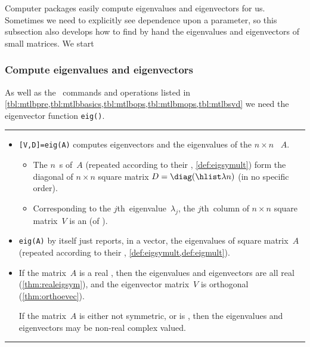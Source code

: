 Computer packages easily compute eigenvalues and eigenvectors for us.
Sometimes we need to explicitly see dependence upon a parameter, so this subsection also develops how to find by hand the eigenvalues and eigenvectors of small matrices.
We start 


\subsubsection{Compute eigenvalues and eigenvectors}
\label{sec:cee}

\begin{table}
\caption{As well as the \script\ commands and operations listed in \cref{tbl:mtlbpre,tbl:mtlbbasics,tbl:mtlbops,tbl:mtlbmops,tbl:mtlbsvd}  we need the eigenvector function \texttt{eig()}.} \label{tbl:mtlbeig}
\hrule
\begin{minipage}{\linewidth}
\begin{itemize}
\item {}\verb|[V,D]=eig(A)| computes eigenvectors and the eigenvalues of the  \(n\times n\) ~\(A\).
\begin{itemize}
\item The \(n\)~s of~\(A\) (repeated according to their , \cref{def:eigsymult}) form the diagonal of \(n\times n\) square matrix \(D=\diag(\hlist\lambda n)\) (in no specific order).
\item Corresponding to the \(j\)th~eigenvalue~\(\lambda_j\), the 
\(j\)th~column of \(n\times n\) square matrix~\(V\) is an 
 (of ).
\end{itemize}
\item \verb|eig(A)| by itself just reports, in a vector, the eigenvalues of square matrix~\(A\) (repeated according to their  , \cref{def:eigsymult,def:eigmult}).

\item If the matrix~\(A\) is a real , then the eigenvalues and eigenvectors are all real (\cref{thm:realeigsym}), and the eigenvector matrix~\(V\) is orthogonal (\cref{thm:orthoevec}).

If the matrix~\(A\) is either not symmetric, or is , then the eigenvalues and eigenvectors may be non-real complex valued.

\end{itemize}
\end{minipage}
\hrule
\end{table}

